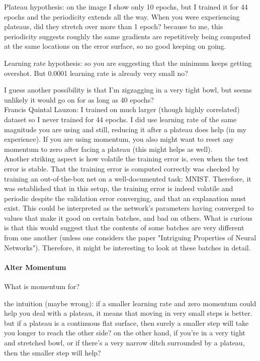 \documentclass[a4paper,11pt]{article}
\begin{document}
Plateau hypothesis: on the image I show only 10 epochs, but I trained it for 44 epochs and the periodicity extends all the way. When you were experiencing plateaus, did they stretch over more than 1 epoch? because to me, this periodicity suggests roughly the same gradients are repetitively being computed at the same locations on the error surface, so no good keeping on going. 

Learning rate hypothesis: so you are suggesting that the minimum keeps getting overshot. But 0.0001 learning rate is already very small no?

I guess another possibility is that I'm zigzagging in a very tight bowl, but seems unlikely it would go on for as long as 40 epochs?﻿\\

Francis Quintal Lauzon: I trained on much larger (though highly correlated) dataset so I never trained for 44 epochs.  I did use learning rate of the same magnitude you are using and still, reducing it after a plateau does help (in my experience).  If you are using momentum, you also might want to reset any momentum to zero after facing a plateau (this might helps as well).﻿\\


Another striking aspect is how volatile the training error is, even when the test error is stable. That the training error is computed correctly was checked by training an out-of-the-box net on a well-documented task: MNIST. Therefore, it was established that in this setup, the training error is indeed volatile and periodic despite the validation error converging, and that an explanation must exist. This could be interpreted as the network's parameters having converged to values that make it good on certain batches, and bad on others. What is curious is that this would suggest that the contents of some batches are very different from one another (unless one considers the paper "Intriguing Properties of Neural Networks"). Therefore, it might be interesting to look at these batches in detail. \\

\paragraph{Alter Momentum}

What is momentum for?

the intuition (maybe wrong): if a smaller learning rate and zero momentum could help you deal with a plateau, it means that moving in very small steps is better. but if a plateau is a continuous flat surface, then surely a smaller step will take you longer to reach the other side? 
on the other hand, if you're in a very tight and stretched bowl, or if there's a very narrow ditch surrounded by a plateau, then the smaller step will help?﻿
\end{document}
